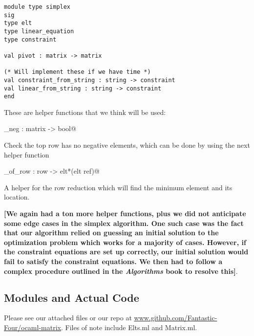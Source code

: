 \documentclass[letterpaper,11pt]{article}
\newcommand{\annot}[1]{\textbf{\color{BrickRed} [#1]}}
\begin{document}
\begin{verbatim}
module type simplex
sig
type elt
type linear_equation
type constraint

val pivot : matrix -> matrix

(* Will implement these if we have time *)
val constraint_from_string : string -> constraint
val linear_from_string : string -> constraint
end
\end{verbatim}

These are helper functions that we think will be used:

\verb@no_neg : matrix -> bool@ 

Check the top row has no negative elements, which can be done by using the next
helper function

\verb@min_of_row : row -> elt*(elt ref)@

A helper for the row reduction which will find the minimum element and its
location.

{\annot{We again had a ton more helper functions, plus we did not anticipate
some edge cases in the simplex algorithm. One such case was the fact that our
algorithm relied on guessing an initial solution to the optimization problem
which works for a majority of cases. However, if the constraint equations are
set up correctly, our initial solution would fail to satisfy the constraint
equations. We then had to follow a complex procedure outlined in the
\emph{Algorithms} book to resolve this}}.

\subsection{Modules and Actual Code}
Please see our attached files or our repo at 
\url{www.github.com/Fantastic-Four/ocaml-matrix}. Files of note include Elts.ml
and Matrix.ml. 
\end{document}
